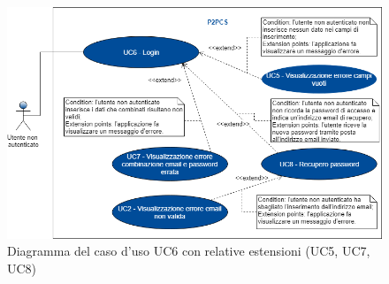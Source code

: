 \begin{figure}[h]
	\includegraphics[width=16cm]{res/images/Schemagenerale2.png}
	\centering
	\caption{Diagramma del caso d'uso UC6 con relative estensioni (UC5, UC7, UC8)}
\end{figure}
\newpage
